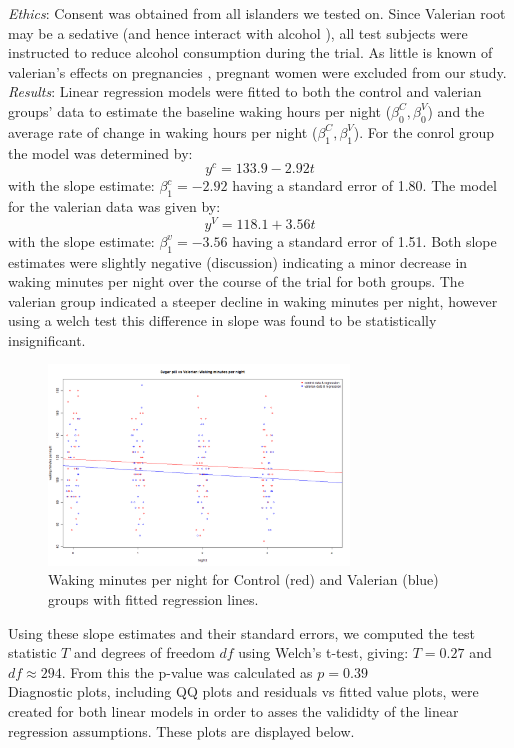 \documentclass[10pt,preprintnumbers,amsmath,amssymb,floatfix,twocolumn,prl]{revtex4-2}
\begin{document}
\textit{Ethics}: Consent was obtained from all islanders we tested on. Since Valerian root may be a sedative (and hence interact with alcohol \cite{ValerianSource1}), all test subjects were instructed to reduce alcohol consumption during the trial. As little is known of valerian's effects on pregnancies \cite{ValerianSource2}, pregnant women were excluded from our study. \\

\textit{Results}: Linear regression models were fitted to both the control and valerian groups' data to estimate the baseline waking hours per night ($\beta_0^C, \beta_0^V$) and the average rate of change in waking hours per night ($\beta_1^C, \beta_1^V$). For the conrol group the model was determined by:
$$y^c = 133.9 - 2.92 t$$
with the slope estimate: $\beta_1^c = - 2.92$ having a standard error of 1.80.
The model for the valerian data was given by: 
$$y^V = 118.1 + 3.56 t$$
with the slope estimate: $\beta_1^v = - 3.56$ having a standard error of 1.51.
Both slope estimates were slightly negative (discussion) indicating a minor decrease in waking minutes per night over the course of the trial for both groups. The valerian group indicated a steeper decline in waking minutes per night, however using a welch test this difference in slope was found to be statistically insignificant. \\
\begin{figure}
\centering
\includegraphics[width = 8cm, height = 6m]{linear_reg.png}
\caption{Waking minutes per night for Control (red) and Valerian (blue) groups with fitted regression lines.}
\end{figure}

Using these slope estimates and their standard errors, we computed the test statistic $T$ and degrees of freedom $df$ using Welch's t-test, giving: $T = 0.27$ and $df \approx 294$. From this the p-value was calculated as $p = 0.39$\\
Diagnostic plots, including QQ plots and residuals vs fitted value plots, were created for both linear models in order to asses the valididty of the linear regression assumptions. These plots are displayed below. \\
\end{document}
